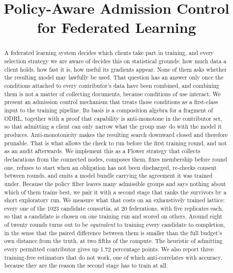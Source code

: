 \documentclass[10pt,conference]{IEEEtran}
\begin{document}
\title{Policy-Aware Admission Control for Federated Learning}

\author{}

\maketitle

\begin{abstract}
A federated learning system decides which clients take part in training, and
every selection strategy we are aware of decides this on statistical grounds:
how much data a client holds, how fast it is, how useful its gradients appear.
None of them asks whether the resulting model may lawfully be used. That
question has an answer only once the conditions attached to every contributor's
data have been combined, and combining them is not a matter of collecting
documents, because conditions of use interact. We present an admission control
mechanism that treats those conditions as a first-class input to the training
pipeline. Its basis is a composition algebra for a fragment of ODRL, together
with a proof that capability is anti-monotone in the contributor set, so that
admitting a client can only narrow what the group may do with the model it
produces. Anti-monotonicity makes the resulting search downward closed and therefore prunable. That is what allows the check to run before the first training round, and not as an audit afterwards. We implement this as a
Flower strategy that collects declarations from the connected nodes, composes
them, fixes membership before round one, refuses to start when an obligation
has not been discharged, re-checks consent between rounds, and emits a model
bundle carrying the agreement it was trained under. Because the policy filter
leaves many admissible groups and says nothing about which of them trains best,
we pair it with a second stage that ranks the survivors by a short exploratory
run. We measure what that costs on an exhaustively trained lattice: every one
of the 1023 candidate consortia, at 20 federations, with five replicates each,
so that a candidate is chosen on one training run and scored on others. Around
eight of twenty rounds turns out to be \emph{equivalent} to training every
candidate to completion, in the sense that the paired difference between them
is smaller than the full budget's own distance from the truth, at two fifths of the compute. The heuristic of admitting every permitted contributor gives up
1.72 percentage points. We also report three training-free estimators that do
not work, one of which anti-correlates with accuracy, because they are the
reason the second stage has to train at all.
\end{abstract}
\end{document}
